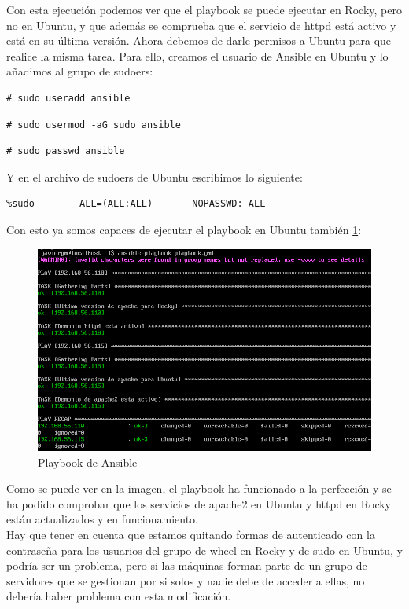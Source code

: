Con esta ejecución podemos ver que el playbook se puede ejecutar en Rocky, pero no en Ubuntu, y que además se comprueba que el servicio de httpd está activo y está en su última versión. Ahora debemos de darle permisos a Ubuntu para que realice la misma tarea. Para ello, creamos el usuario de Ansible en Ubuntu y lo añadimos al grupo de sudoers:

\begin{lstlisting}
# sudo useradd ansible
\end{lstlisting}

\begin{lstlisting}
# sudo usermod -aG sudo ansible
\end{lstlisting}

\begin{lstlisting}
# sudo passwd ansible
\end{lstlisting}

Y en el archivo de sudoers de Ubuntu escribimos lo siguiente:

\begin{lstlisting}
%sudo        ALL=(ALL:ALL)       NOPASSWD: ALL
\end{lstlisting}

Con esto ya somos capaces de ejecutar el playbook en Ubuntu también \ref{fig:ansible-playbook-sudo}: 

\begin{figure}[H]
  \centering
  \includegraphics[scale=0.6]{Captura27}
  \caption{Playbook de Ansible}
  \label{fig:ansible-playbook-sudo}
\end{figure}

Como se puede ver en la imagen, el playbook ha funcionado a la perfección y se ha podido comprobar que los servicios de apache2 en Ubuntu y httpd en Rocky están actualizados y en funcionamiento.\\

Hay que tener en cuenta que estamos quitando formas de autenticado con la contraseña para los usuarios del grupo de wheel en Rocky y de sudo en Ubuntu, y podría ser un problema, pero si las máquinas forman parte de un grupo  de servidores que se gestionan por si solos y nadie debe de acceder a ellas, no debería haber problema con esta modificación.

